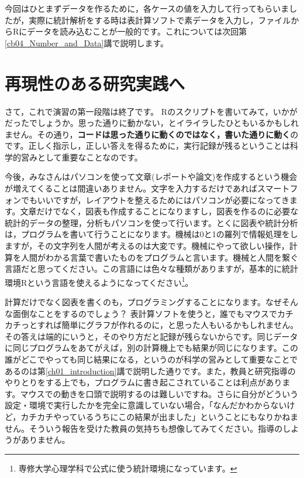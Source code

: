 \documentclass{ltjsbook}
\begin{document}
今回はひとまずデータを作るために，各ケースの値を入力して行ってもらいましたが，実際に統計解析をする時は表計算ソフトで素データを入力し，ファイルからRにデータを読み込むことが一般的です。これについては次回第\ref{cb04_Number_and_Data}講で説明します。


\section{再現性のある研究実践へ}
\label{reproducibility}

さて，これで演習の第一段階は終了です。
Rのスクリプトを書いてみて，いかがだったでしょうか。思った通りに動かない，とイライラしたひともいるかもしれません。その通り，\textbf{コードは思った通りに動くのではなく，書いた通りに動く}のです。正しく指示し，正しい答えを得るために，実行記録が残るということは科学的営みとして重要なことなのです。

今後，みなさんはパソコンを使って文章(レポートや論文)を作成するという機会が増えてくることは間違いありません。文字を入力するだけであればスマートフォンでもいいですが，レイアウトを整えるためにはパソコンが必要になってきます。文章だけでなく，図表も作成することになりますし，図表を作るのに必要な統計的データの整理，分析もパソコンを使って行います。とくに図表や統計分析は，プログラムを書いて行うことになります。機械は0と1の羅列で情報処理をしますが，その文字列を人間が考えるのは大変です。機械にやって欲しい操作，計算を人間がわかる言葉で書いたものをプログラムと言います。機械と人間を繋ぐ言語だと思ってください。この言語には色々な種類がありますが，基本的に統計環境Rという言語を使えるようになってください\footnote{専修大学心理学科で公式に使う統計環境になっています。}。

計算だけでなく図表を書くのも，プログラミングすることになります。なぜそんな面倒なことをするのでしょう？ 表計算ソフトを使うと，誰でもマウスでカチカチっとすれば簡単にグラフが作れるのに，と思った人もいるかもしれません。その答えは端的にいうと，そのやり方だと記録が残らないからです。同じデータに同じプログラムをあてがえば，別の計算機上でも結果が同じになります。この誰がどこでやっても同じ結果になる，というのが科学の営みとして重要なことであるのは第\ref{ch01_introduction}講で説明した通りです。また，教員と研究指導のやりとりをする上でも，プログラムに書き起こされていることは利点があります。マウスでの動きを口頭で説明するのは難しいですね。さらに自分がどういう設定・環境で実行したかを完全に意識していない場合，「なんだかわからないけど，カチカチやっているうちにこの結果が出ました」ということにもなりかねません。そういう報告を受けた教員の気持ちも想像してみてください。指導のしようがありません。
\end{document}
